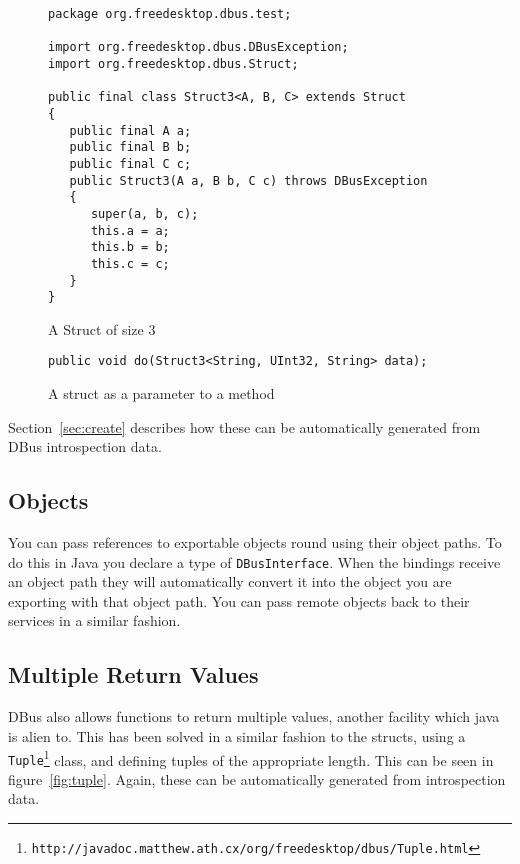 \documentclass[a4paper,12pt]{article}
\begin{document}
\begin{figure}[htb]
\begin{center}
\begin{verbatim}
package org.freedesktop.dbus.test;

import org.freedesktop.dbus.DBusException;
import org.freedesktop.dbus.Struct;

public final class Struct3<A, B, C> extends Struct
{
   public final A a;
   public final B b;
   public final C c;
   public Struct3(A a, B b, C c) throws DBusException
   {
      super(a, b, c);
      this.a = a;
      this.b = b;
      this.c = c;
   }
}
\end{verbatim}
\end{center}
\caption{A Struct of size 3}
\label{fig:struct}
\end{figure}

\begin{figure}[htb]
\begin{center}
\begin{verbatim}
public void do(Struct3<String, UInt32, String> data);
\end{verbatim}
\end{center}
\caption{A struct as a parameter to a method}
\label{fig:structmethod}
\end{figure}


Section~\ref{sec:create} describes how these can be automatically
generated from DBus introspection data.

\subsection{Objects}

You can pass references to exportable objects round using their object paths.
To do this in Java you declare a type of {\tt DBusInterface}. When the bindings
receive an object path they will automatically convert it into the object you
are exporting with that object path. You can pass remote objects back to their
services in a similar fashion.


\subsection{Multiple Return Values}

DBus also allows functions to return multiple values, another
facility which java is alien to. This has been solved in a similar
fashion to the structs, using a {\tt
Tuple\footnote{http://javadoc.matthew.ath.cx/org/freedesktop/dbus/Tuple.html}} class, and
defining tuples of the appropriate length. This can be seen in
figure~\ref{fig:tuple}. Again, these can be automatically generated
from introspection data.
\end{document}
